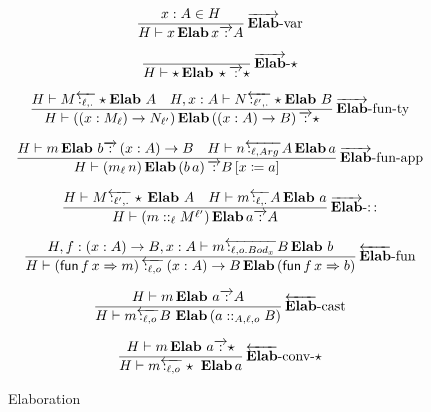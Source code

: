 \begin{figure}
\[
\frac{
 x:A\in H
}{
 H\vdash x\,\textbf{Elab}\,x\overrightarrow{\,:\,}A
}
\operatorname{\overrightarrow{\textbf{Elab}}-var}
\]

\[
\frac{\,}{H\vdash\star\,\textbf{Elab}\,\star\overrightarrow{\,:\,}\star}
\operatorname{\overrightarrow{\textbf{Elab}}-\star}
\]

\[
\frac{
 H\vdash M\overleftarrow{\,:_{\ell,.}\,}\star\textbf{Elab}\ A\quad H,x:A\vdash N\overleftarrow{\,:_{\ell',.}\,}\star\textbf{Elab}\ B
}{
 H\vdash\left(\left(x:M_{\ell}\right)\rightarrow N_{\ell'}\right)\textbf{Elab}\left(\left(x:A\right)\rightarrow B\right)\overrightarrow{\,:\,}\star
}
\operatorname{\overrightarrow{\textbf{Elab}}-fun-ty}
\]

\[
\frac{H\vdash m\,\textbf{Elab}\ b\overrightarrow{\,:\,}\left(x:A\right)\rightarrow B\quad H\vdash n\overleftarrow{\,:_{\ell,Arg}\,}A\,\textbf{Elab}\,a}{H\vdash\left(m_{\ell}\,n\right)\textbf{Elab}\left(b\,a\right)\overrightarrow{\,:\,}B\left[x\coloneqq a\right]}\rulename{\overrightarrow{\textbf{Elab}}-fun-app}
\]

\[
\frac{H\vdash M\overleftarrow{\,:_{\ell',.}\,}\star\,\textbf{Elab}\ A\quad H\vdash m\overleftarrow{\,:_{\ell,.}\,}A\,\textbf{Elab}\ a}{H\vdash\left(m::_{\ell}M^{\ell'}\right)\textbf{Elab}\,a\overrightarrow{\,:\,}A}\rulename{\overrightarrow{\textbf{Elab}}-::}
\]

\[
\frac{H,f:\left(x:A\right)\rightarrow B,x:A\vdash m\overleftarrow{\,:_{\ell,o.Bod_x}\,}B\,\textbf{Elab}\ b}{H\vdash\left(\mathsf{fun}\,f\,x\Rightarrow m\right)\overleftarrow{\,:_{\ell,o}\,}\left(x:A\right)\rightarrow B\,\textbf{Elab}\left(\mathsf{fun}\,f\,x\Rightarrow b\right)}\rulename{\overleftarrow{\textbf{Elab}}-fun}
\]

\[
\frac{H\vdash m\,\textbf{Elab}\ a\overrightarrow{\,:\,}A}{H\vdash m\overleftarrow{\,:_{\ell,o}\,}B\ \textbf{Elab}\left(a::_{A,\ell,o}B\right)}\rulename{\overleftarrow{\textbf{Elab}}-cast}
\]

\[
\frac{H\vdash m\,\textbf{Elab}\ a\overrightarrow{\,:\,}\star}{H\vdash m\overleftarrow{\,:_{\ell,o}\,}\star\ \textbf{Elab}\,a}
\rulename{\overleftarrow{\textbf{Elab}}-conv-\star}
\]


\caption{Elaboration}
\label{fig:elaboration}
\end{figure}

